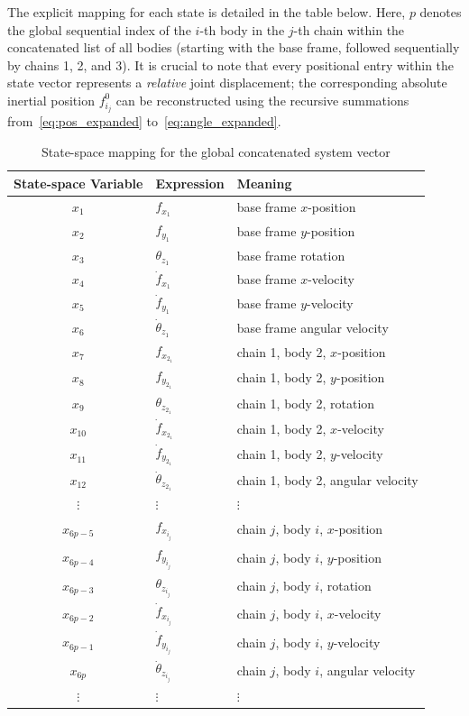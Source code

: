 The explicit mapping for each state is detailed in the table below. Here, $p$ denotes the global sequential index of the $i$-th body in the $j$-th chain within the concatenated list of all bodies (starting with the base frame, followed sequentially by chains 1, 2, and 3). It is crucial to note that every positional entry within the state vector represents a \emph{relative} joint displacement; the corresponding absolute inertial position $f^0_{i_j}$ can be reconstructed using the recursive summations from~\eqref{eq:pos_expanded} to~\eqref{eq:angle_expanded}.

\begin{table}[htbp]
\centering
\caption{State-space mapping for the global concatenated system vector}
\label{tab:state_mapping}
\begin{tabular}{cll}
\toprule
State-space Variable & Expression & Meaning \\
\midrule
$x_1$       & $f_{x_1}$                  & base frame $x$-position \\
$x_2$       & $f_{y_1}$                  & base frame $y$-position \\
$x_3$       & $\theta_{z_1}$             & base frame rotation \\
$x_4$       & $\dot{f}_{x_1}$            & base frame $x$-velocity \\
$x_5$       & $\dot{f}_{y_1}$            & base frame $y$-velocity \\
$x_6$       & $\dot{\theta}_{z_1}$       & base frame angular velocity \\
$x_7$       & $f_{x_{2_1}}$              & chain 1, body 2, $x$-position \\
$x_8$       & $f_{y_{2_1}}$              & chain 1, body 2, $y$-position \\
$x_9$       & $\theta_{z_{2_1}}$         & chain 1, body 2, rotation \\
$x_{10}$    & $\dot{f}_{x_{2_1}}$        & chain 1, body 2, $x$-velocity \\
$x_{11}$    & $\dot{f}_{y_{2_1}}$        & chain 1, body 2, $y$-velocity \\
$x_{12}$    & $\dot{\theta}_{z_{2_1}}$   & chain 1, body 2, angular velocity \\
$\vdots$    & $\vdots$                   & $\vdots$ \\
$x_{6p-5}$  & $f_{x_{i_j}}$              & chain $j$, body $i$, $x$-position \\
$x_{6p-4}$  & $f_{y_{i_j}}$              & chain $j$, body $i$, $y$-position \\
$x_{6p-3}$  & $\theta_{z_{i_j}}$         & chain $j$, body $i$, rotation \\
$x_{6p-2}$  & $\dot{f}_{x_{i_j}}$        & chain $j$, body $i$, $x$-velocity \\
$x_{6p-1}$  & $\dot{f}_{y_{i_j}}$        & chain $j$, body $i$, $y$-velocity \\
$x_{6p}$    & $\dot{\theta}_{z_{i_j}}$   & chain $j$, body $i$, angular velocity \\
$\vdots$    & $\vdots$                   & $\vdots$ \\
\bottomrule
\end{tabular}
\end{table}

